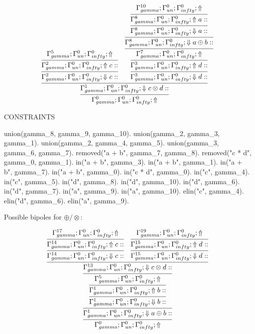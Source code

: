 \documentclass[a4paper, 11pt]{article}
\begin{document}
\[
\infer{\Gamma_{ gamma}^{0} ; \Gamma_{un}^{0} ; \Gamma_{ infty}^{0} ;  \Uparrow }
{\infer{\Gamma_{ gamma}^{1} ; \Gamma_{un}^{0} ; \Gamma_{ infty}^{0} ;  \Downarrow c \otimes d :: }
{\infer{\Gamma_{ gamma}^{2} ; \Gamma_{un}^{0} ; \Gamma_{ infty}^{0} ;  \Downarrow c :: }
{\infer{\Gamma_{ gamma}^{2} ; \Gamma_{un}^{0} ; \Gamma_{ infty}^{0} ;  \Uparrow c :: }
{\Gamma_{ gamma}^{5} ; \Gamma_{un}^{0} ; \Gamma_{ infty}^{0} ;  \Uparrow }}
&
\infer{\Gamma_{ gamma}^{3} ; \Gamma_{un}^{0} ; \Gamma_{ infty}^{0} ;  \Downarrow d :: }
{\infer{\Gamma_{ gamma}^{3} ; \Gamma_{un}^{0} ; \Gamma_{ infty}^{0} ;  \Uparrow d :: }
{\infer{\Gamma_{ gamma}^{7} ; \Gamma_{un}^{0} ; \Gamma_{ infty}^{0} ;  \Uparrow }
{\infer{\Gamma_{ gamma}^{8} ; \Gamma_{un}^{0} ; \Gamma_{ infty}^{0} ;  \Downarrow a \oplus b :: }
{\infer{\Gamma_{ gamma}^{8} ; \Gamma_{un}^{0} ; \Gamma_{ infty}^{0} ;  \Downarrow a :: }
{\infer{\Gamma_{ gamma}^{8} ; \Gamma_{un}^{0} ; \Gamma_{ infty}^{0} ;  \Uparrow a :: }
{\Gamma_{ gamma}^{10} ; \Gamma_{un}^{0} ; \Gamma_{ infty}^{0} ;  \Uparrow }}}}}}}}
\] 
 
CONSTRAINTS 

union(gamma\_8, gamma\_9, gamma\_10).
union(gamma\_2, gamma\_3, gamma\_1).
union(gamma\_2, gamma\_4, gamma\_5).
union(gamma\_3, gamma\_6, gamma\_7).
removed("a + b", gamma\_7, gamma\_8).
removed("c * d", gamma\_0, gamma\_1).
in("a + b", gamma\_3).
in("a + b", gamma\_1).
in("a + b", gamma\_7).
in("a + b", gamma\_0).
in("c * d", gamma\_0).
in("c", gamma\_4).
in("c", gamma\_5).
in("d", gamma\_8).
in("d", gamma\_10).
in("d", gamma\_6).
in("d", gamma\_7).
in("a", gamma\_9).
in("a", gamma\_10).
elin("c", gamma\_4).
elin("d", gamma\_6).
elin("a", gamma\_9).

Possible bipoles for $\oplus/\otimes$:

\[
\infer{\Gamma_{ gamma}^{0} ; \Gamma_{un}^{0} ; \Gamma_{ infty}^{0} ;  \Uparrow }
{\infer{\Gamma_{ gamma}^{1} ; \Gamma_{un}^{0} ; \Gamma_{ infty}^{0} ;  \Downarrow a \oplus b :: }
{\infer{\Gamma_{ gamma}^{1} ; \Gamma_{un}^{0} ; \Gamma_{ infty}^{0} ;  \Downarrow b :: }
{\infer{\Gamma_{ gamma}^{1} ; \Gamma_{un}^{0} ; \Gamma_{ infty}^{0} ;  \Uparrow b :: }
{\infer{\Gamma_{ gamma}^{5} ; \Gamma_{un}^{0} ; \Gamma_{ infty}^{0} ;  \Uparrow }
{\infer{\Gamma_{ gamma}^{13} ; \Gamma_{un}^{0} ; \Gamma_{ infty}^{0} ;  \Downarrow c \otimes d :: }
{\infer{\Gamma_{ gamma}^{14} ; \Gamma_{un}^{0} ; \Gamma_{ infty}^{0} ;  \Downarrow c :: }
{\infer{\Gamma_{ gamma}^{14} ; \Gamma_{un}^{0} ; \Gamma_{ infty}^{0} ;  \Uparrow c :: }
{\Gamma_{ gamma}^{17} ; \Gamma_{un}^{0} ; \Gamma_{ infty}^{0} ;  \Uparrow }}
&
\infer{\Gamma_{ gamma}^{15} ; \Gamma_{un}^{0} ; \Gamma_{ infty}^{0} ;  \Downarrow d :: }
{\infer{\Gamma_{ gamma}^{15} ; \Gamma_{un}^{0} ; \Gamma_{ infty}^{0} ;  \Uparrow d :: }
{\Gamma_{ gamma}^{19} ; \Gamma_{un}^{0} ; \Gamma_{ infty}^{0} ;  \Uparrow }}}}}}}}
\] 
 
\end{document}
